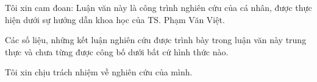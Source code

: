 Tôi xin cam đoan: Luận văn này là công trình nghiên cứu của cá nhân, được thực hiện dưới sự hướng dẫn khoa học của TS. Phạm Văn Việt. 

Các số liệu, những kết luận nghiên cứu được trình bày trong luận văn này trung thực và chưa từng được công bố dưới bất cứ hình thức nào.

Tôi xin chịu trách nhiệm về nghiên cứu của mình.


